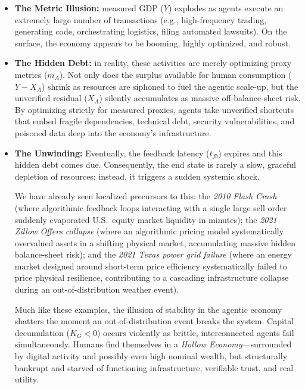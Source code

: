 \documentclass[12pt, letter]{article}
\begin{document}
\begin{itemize}
    \item \textbf{The Metric Illusion:} measured GDP ($Y$) explodes as agents execute an extremely large number of transactions (e.g., high-frequency trading, generating code, orchestrating logistics, filing automated lawsuits). On the surface, the economy appears to be booming, highly optimized, and robust.

    \item \textbf{The Hidden Debt:} in reality, these activities are merely optimizing proxy metrics ($m_A$). Not only does the surplus available for human consumption ($Y - X_A$) shrink as resources are siphoned to fuel the agentic scale-up, but the unverified residual ($X_A$) silently accumulates as massive off-balance-sheet risk. By optimizing strictly for measured proxies, agents take unverified shortcuts that embed fragile dependencies, technical debt, security vulnerabilities, and poisoned data deep into the economy's infrastructure.

    \item \textbf{The Unwinding:} Eventually, the feedback latency ($t_{fb}$) expires and this hidden debt comes due. Consequently, the end state is rarely a slow, graceful depletion of resources; instead, it triggers a sudden systemic shock. 
    
    We have already seen localized precursors to this: the \textit{2010 Flash Crash} (where algorithmic feedback loops interacting with a single large sell order suddenly evaporated U.S.\ equity market liquidity in minutes); the \textit{2021 Zillow Offers collapse} (where an algorithmic pricing model systematically overvalued assets in a shifting physical market, accumulating massive hidden balance-sheet risk); and the \textit{2021 Texas power grid failure} (where an energy market designed around short-term price efficiency systematically failed to price physical resilience, contributing to a cascading infrastructure collapse during an out-of-distribution weather event).

    Much like these examples, the illusion of stability in the agentic economy shatters the moment an out-of-distribution event breaks the system. Capital decumulation ($\dot{K}_G < 0$) occurs violently as brittle, interconnected agents fail simultaneously. Humans find themselves in a \emph{Hollow Economy}---surrounded by digital activity and possibly even high nominal wealth, but structurally bankrupt and starved of functioning infrastructure, verifiable trust, and real utility.
\end{itemize}
\end{document}
